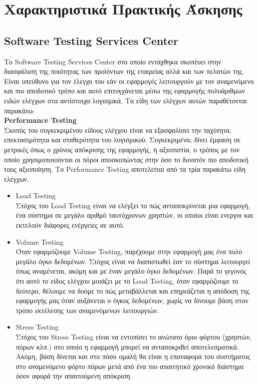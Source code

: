 \chapter*{Χαρακτηριστικά Πρακτικής Άσκησης}

\section*{\textlatin{Software Testing Services Center}}

Το Software Testing Services Center στο οποίο εντάχθηκα σκοπέυει στην διασφάλιση της ποιότητας των προϊόντων της εταιρείας αλλά και των πελατών της. Είναι υπεύθυνο για τον έλεγχο του εάν οι εφαρμογές λειτουργούν με τον αναμενόμενο και πιο αποδοτικό τρόπο και αυτό επιτυγχάνεται μέσω της εφαρμογής πολυάριθμων ειδών ελέγχων στα αντίστοιχα λογισμικά. Τα είδη των ελέγχων αυτών παραθέτονται παρακάτω:\\

\textbf{\textlatin{Performance Testing}}\\
Σκοπός του συγκεκριμένου είδους ελέγχου είναι να εξασφαλίσει την ταχύτητα, επεκτασιμότητα και σταθερότητα του λογισμικού. Συγκεκριμένα, δίνει έμφαση σε μετρικές όπως ο χρόνος απόκρισης της εφαρμογής, η αξιοπιστία, ο τρόπος με τον οποίο χρησιμοποιούνται οι πόροι αποσκοπώντας στην όσο το δυνατόν πιο αποδοτική τους αξιοποίηση. Το \textlatin{Performance Testing} αποτελείται από τα τρία παρακάτω είδη ελέγχων.

\begin{itemize}
    \item \textlatin{Load Testing}\\
    Στόχος του \textlatin{Load Testing} είναι να ελέγξει το πώς ανταποκρίνεται μια εφαρμογή, ένα σύστημα σε μεγάλο αριθμό ταυτόχρονων χρηστών, οι οποίοι είναι ενεργοι και εκτελούν διάφορες ενέργειες σε αυτό.
    \item \textlatin{Volume Testing}\\
    Όταν εφαρμόζουμε \textlatin{Volume Testing}, παρέχουμε στην εφαρμογή μας ένα πολύ μεγάλο όγκο δεδομένων. Στόχος είναι να διαπιστωθεί έαν το σύστημα λειτουργεί όπως αναμένεται, ακόμη και με έναν μεγάλο όγκο δεδομένων. Παρά το γεγονός ότι αυτό το είδος ελέγχου μοιάζει με το \textlatin{Load Testing}, όταν εφαρμόζουμε το δεύτερο, θέλουμε να δούμε το πώς μεταβάλλεται και επηρεάζεται η απόδοση της εφαρμογής μας όταν αυξάνεται ο όγκος δεδομένων, χωρίς να δίνουμε βάση στον τρόπο εκτέλεσης των αναμενόμενων λειτουργιών.
    \item \textlatin{Stress Testing}\\
    Στόχος του \textlatin{Stress Testing} είναι να εντοπίσει το ανώτατο όριο φόρτου (χρηστών, πόρων κλπ.) στο οποίο η εφαρμογή μπορεί να ανταποκριθεί αποτελεσματικά. Ακόμη, βάση δίνεται και στο πόσο ομαλή θα είναι η επαναφορά του συστήματος στο αναμενόμενο φόρτο πόρων μετά από ένα πιο απαιτητικό χρονικό διάστημα όσον αφορά την απαιτούμενη απόκριση. \\
\end{itemize}


